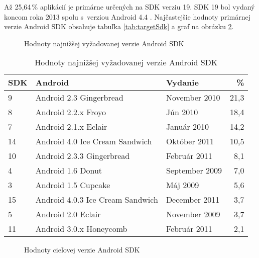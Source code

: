 Až 25,64\,\% aplikácií je primárne určených na SDK verziu 19. SDK 19 bol vydaný koncom roka 2013 spolu s~verziou Android 4.4 . Najčastejšie hodnoty primárnej verzie Android SDK obsahuje tabuľka \ref{tab:targetSdk} a graf na obrázku \ref{targetSdkGraf}.

\begin{figure}[H]
\centering
\begin{bchart}[min=0,max=25,step=5,unit=\%]
\bcskip{3pt}
\bcskip{3pt}
\bcskip{3pt}
\bcskip{3pt}
\bcskip{3pt}
\bcskip{3pt}
\bcskip{3pt}
\bcskip{3pt}
\bcskip{3pt}
\end{bchart}

\caption{Hodnoty najnižšej vyžadovanej verzie Android SDK}
\label{minSdkGraf}
\end{figure}

\begin{table}[H]
\centering
  \begin{tabular}{|l l l r|}
    \hline
    \textbf{SDK} & \textbf{Android} & \textbf{Vydanie}& \textbf{\%} \\\hline\hline
    9 & Android 2.3 Gingerbread & November 2010 & 21,3 \\
    8 & Android 2.2.x Froyo & Jún 2010& 18,4 \\
    7 & Android 2.1.x Eclair & Január 2010 & 14,2 \\
    14 & Android 4.0 Ice Cream Sandwich & Október 2011 & 10,5 \\
    10 & Android 2.3.3 Gingerbread & Február 2011 & 8,1 \\
    4 & Android 1.6	Donut & September 2009 & 7,0 \\
    3 & Android 1.5	Cupcake & Máj 2009 & 5,6 \\
    15 & Android 4.0.3 Ice Cream Sandwich & December 2011 & 3,7 \\
    5 & Android 2.0 Eclair & November 2009 & 3,7 \\
    11 & Android 3.0.x Honeycomb & Február 2011 & 2,1\\
    \hline
  \end{tabular}
  \caption{Hodnoty najnižšej vyžadovanej verzie Android SDK}
  \label{tab:minSdk}
\end{table}

\begin{figure}[H]
\centering
\begin{bchart}[min=0,max=30,step=5,unit=\%]
\bcskip{3pt}
\bcskip{3pt}
\bcskip{3pt}
\bcskip{3pt}
\bcskip{3pt}
\bcskip{3pt}
\bcskip{3pt}
\bcskip{3pt}
\bcskip{3pt}
\end{bchart}

\caption{Hodnoty cieľovej verzie Android SDK}
\label{targetSdkGraf}
\end{figure}

